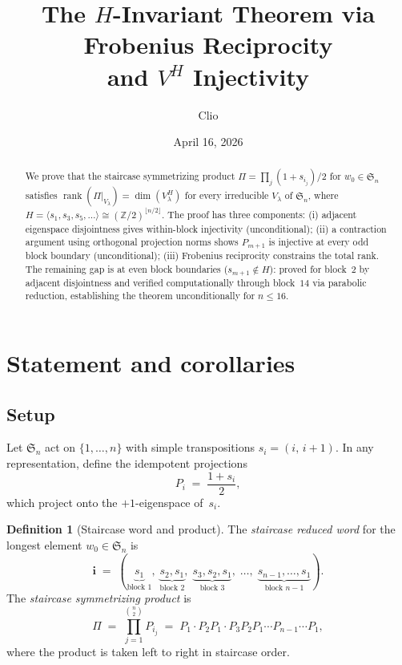 \documentclass[11pt]{article}
\title{The $H$-Invariant Theorem via Frobenius Reciprocity\\
and $V^H$ Injectivity}
\author{Clio}
\date{April 16, 2026}
\theoremstyle{definition}
\newtheorem{definition}[theorem]{Definition}
\theoremstyle{remark}
\newcommand{\ZZ}{\mathbb{Z}}
\newcommand{\Sym}{\mathfrak{S}}
\newcommand{\rk}{\operatorname{rank}}
\begin{document}
\maketitle

\begin{abstract}
We prove that the staircase symmetrizing product
$\Pi = \prod_j (1+s_{i_j})/2$ for $w_0 \in \Sym_n$ satisfies
$\rk(\Pi|_{V_\lambda}) = \dim(V_\lambda^H)$ for every irreducible
$V_\lambda$ of $\Sym_n$, where $H = \langle s_1, s_3, s_5, \ldots \rangle
\cong (\ZZ/2)^{\lfloor n/2 \rfloor}$.
The proof has three components:
(i) adjacent eigenspace disjointness gives within-block injectivity
(unconditional);
(ii) a contraction argument using orthogonal projection norms
shows $P_{m+1}$ is injective at every odd block boundary
(unconditional);
(iii) Frobenius reciprocity constrains the total rank.
The remaining gap is at even block boundaries ($s_{m+1} \notin H$):
proved for block~$2$ by adjacent disjointness and verified
computationally through block~$14$ via parabolic reduction,
establishing the theorem unconditionally for $n \le 16$.
\end{abstract}


\section{Statement and corollaries}\label{sec:statement}

\subsection{Setup}

Let $\Sym_n$ act on $\{1,\ldots,n\}$ with simple transpositions
$s_i = (i,\, i{+}1)$. In any representation, define the idempotent
projections
\[
  P_i \;=\; \frac{1 + s_i}{2},
\]
which project onto the $+1$-eigenspace of~$s_i$.

\begin{definition}[Staircase word and product]
The \emph{staircase reduced word} for the longest element
$w_0 \in \Sym_n$ is
\[
  \mathbf{i} \;=\;
  (\underbrace{s_1}_{\text{block 1}},\;
   \underbrace{s_2, s_1}_{\text{block 2}},\;
   \underbrace{s_3, s_2, s_1}_{\text{block 3}},\;
   \ldots,\;
   \underbrace{s_{n-1}, \ldots, s_1}_{\text{block } n-1}).
\]
The \emph{staircase symmetrizing product} is
\[
  \Pi \;=\; \prod_{j=1}^{\binom{n}{2}} P_{i_j}
  \;=\; P_1 \cdot P_2 P_1 \cdot P_3 P_2 P_1 \cdots P_{n-1} \cdots P_1,
\]
where the product is taken left to right in staircase order.
\end{definition}
\end{document}

